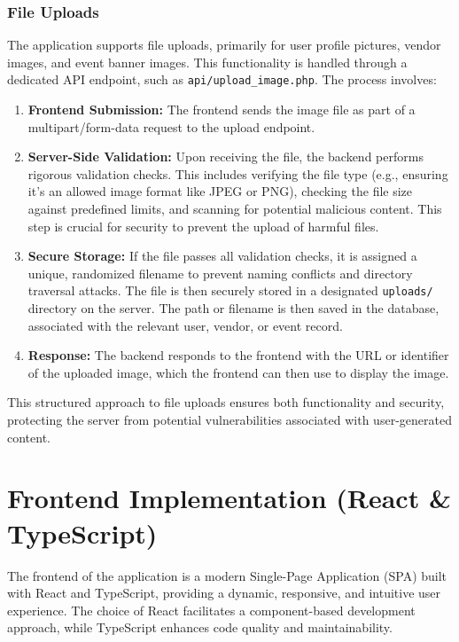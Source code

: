 \documentclass{report}
\begin{document}
\subsubsection{File Uploads}
\label{sec:file_uploads}
The application supports file uploads, primarily for user profile pictures, vendor images, and event banner images. This functionality is handled through a dedicated API endpoint, such as \texttt{api/upload\_image.php}. The process involves:
\begin{enumerate}
    \item \textbf{Frontend Submission:} The frontend sends the image file as part of a multipart/form-data request to the upload endpoint.
    \item \textbf{Server-Side Validation:} Upon receiving the file, the backend performs rigorous validation checks. This includes verifying the file type (e.g., ensuring it's an allowed image format like JPEG or PNG), checking the file size against predefined limits, and scanning for potential malicious content. This step is crucial for security to prevent the upload of harmful files.
    \item \textbf{Secure Storage:} If the file passes all validation checks, it is assigned a unique, randomized filename to prevent naming conflicts and directory traversal attacks. The file is then securely stored in a designated \texttt{uploads/} directory on the server. The path or filename is then saved in the database, associated with the relevant user, vendor, or event record.
    \item \textbf{Response:} The backend responds to the frontend with the URL or identifier of the uploaded image, which the frontend can then use to display the image.
\end{enumerate}
This structured approach to file uploads ensures both functionality and security, protecting the server from potential vulnerabilities associated with user-generated content.

\section{Frontend Implementation (React \& TypeScript)}
\label{sec:frontend_implementation}
The frontend of the application is a modern Single-Page Application (SPA) built with React and TypeScript, providing a dynamic, responsive, and intuitive user experience. The choice of React facilitates a component-based development approach, while TypeScript enhances code quality and maintainability.
\end{document}
